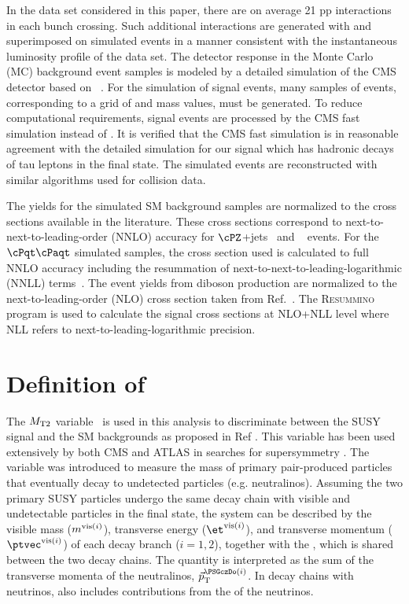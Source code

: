 In the data set considered in this paper,
there are on average 21 pp interactions in each bunch crossing.
Such additional interactions are generated with \PYTHIA and superimposed on simulated events in a manner consistent with
the instantaneous luminosity profile of the data set.
The detector response in the  Monte Carlo (MC) background event samples is modeled by a
detailed simulation
of the CMS detector based on {\GEANTfour}~\cite{Agostinelli:2002hh}.
For the simulation of signal events, many samples of events, corresponding to a grid of \PSGcpmDo and \PSGczDo mass values, must be generated.
To reduce  computational requirements, signal events are processed by the CMS fast simulation \cite{Abdullin:2011zz} instead of {\GEANTfour}.
It is verified that the CMS fast simulation is in reasonable agreement with the detailed simulation for our signal which has hadronic decays of
tau leptons in the final state.
The simulated events are reconstructed with similar algorithms used for collision data.

The yields for the simulated SM background samples are normalized to the cross sections available in the literature.
These cross sections correspond to next-to-next-to-leading-order (NNLO) accuracy for $\cPZ$+jets~\cite{Melnikov:2006kv}
and \wjets~\cite{xsec_WZ} events. For the $\cPqt\cPaqt$ simulated samples, the cross section used is calculated to full NNLO accuracy including
the resummation of next-to-next-to-leading-logarithmic (NNLL) terms~\cite{Czakon:2011xx}.
The event yields from diboson production are normalized to the next-to-leading-order (NLO) cross section  taken from Ref.~\cite{Campbell:2011bn}.
The \textsc{Resummino}~\cite{Fuks:2012qx,Fuks:2013vua,Fuks:2013lya} program is used to calculate the signal cross sections at NLO+NLL level where
NLL refers to next-to-leading-logarithmic precision.
\section{\texorpdfstring{Definition of \mttwo}{Definition of MT2}}
\label{sect:mt2def}
The ${M_\mathrm{ T2}}$ variable~\cite{Lester:1999tx,Barr:2003rg} is used in this analysis to discriminate between the SUSY signal and the SM backgrounds as proposed in Ref \cite{Barr:2009wu}. This variable has been used extensively by both CMS and ATLAS in searches for supersymmetry \cite{Khachatryan:2015vra,Aad:2014yka}.
The variable was introduced to measure the mass of primary pair-produced  particles that eventually decay to undetected particles (e.g. neutralinos). Assuming the two primary SUSY particles undergo the same decay chain with visible and undetectable particles in the final state, the system can be described by the visible mass ($m^{\text{vis}(i)}$), transverse energy ($\etvisi$), and transverse momentum ($\vptvisi$) of each decay branch ($i=1,2$), together with the
\ptvecmiss, which is shared between the two decay chains. The quantity \ptvecmiss is interpreted as the sum of the transverse momenta
of the neutralinos, $\vec{p}_\mathrm{T}^{\PSGczDo(i)}$.
In decay chains with neutrinos, \ptvecmiss also includes contributions from the \ptvec of the neutrinos.

